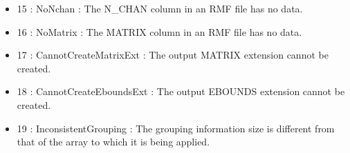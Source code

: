\documentclass[11pt]{book}
\begin{document}
\begin{itemize}
\item 15 : NoNchan : The N\_CHAN column in an RMF file has no data.

\item 16 : NoMatrix : The MATRIX column in an RMF file has no data.

\item 17 : CannotCreateMatrixExt : The output MATRIX extension cannot be created.

\item 18 : CannotCreateEboundsExt : The output EBOUNDS extension cannot be created.

\item 19 : InconsistentGrouping : The grouping information size is
different from that of the array to which it is being applied.

\end{itemize}
\end{document}
